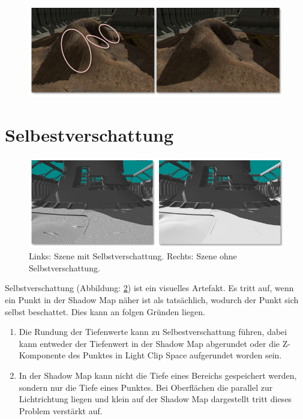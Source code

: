 \begin{itemize}
\begin{figure}[H]
\begin{center}
        \includegraphics[width=1\textwidth]{res/img/projective-aliasing/image.jpg}
        \caption{}
        \label{fig:projective-aliasing}
      \end{center}
    \end{figure}
\end{itemize}


\section{Selbestverschattung}
\label{section:self-shadow}
\begin{figure}[H]
	\begin{center}
    \includegraphics[width=1\textwidth]{res/img/shadow-acne1/image.jpg}
    \caption{Links\hspace{6pt}: Szene mit Selbstverschattung. 
         \newline Rechts: Szene ohne Selbstverschattung.} 
	  \label{fig:shadow-acne-artefact}
	\end{center}
\end{figure}
Selbstverschattung (Abbildung: \ref{fig:shadow-acne-artefact}) ist ein visuelles Artefakt.
Es tritt auf, wenn ein Punkt in der Shadow Map näher ist als tatsächlich, wodurch der Punkt sich selbst beschattet.
Dies kann an folgen Gründen liegen.
\begin{enumerate}
  \item Die Rundung der Tiefenwerte kann zu Selbestverschattung führen, dabei kann entweder der Tiefenwert in der Shadow Map
    abgerundet oder die Z-Komponente des Punktes in Light Clip Space aufgerundet worden sein.
  \item In der Shadow Map kann nicht die Tiefe eines Bereichs
    gespeichert werden, sondern nur die Tiefe eines Punktes.
    Bei Oberflächen die parallel zur Lichtrichtung liegen und klein auf der Shadow Map dargestellt tritt dieses Problem verstärkt auf.
\end{enumerate}


